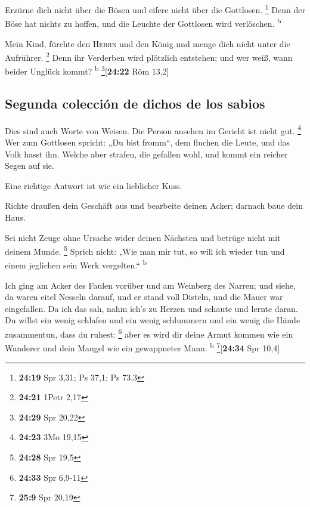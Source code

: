  Erzürne dich nicht über die Bösen und eifere nicht über
die Gottlosen. \footnote{\textbf{24:19} Spr 3,31; Ps 37,1; Ps 73,3}
 Denn der Böse hat nichts zu hoffen, und die Leuchte der
Gottlosen wird verlöschen. \textsuperscript{b}

 Mein Kind, fürchte den \textsc{Herrn} und den König und
menge dich nicht unter die Aufrührer. \footnote{\textbf{24:21} 1Petr
  2,17}  Denn ihr Verderben wird plötzlich entstehen; und
wer weiß, wann beider Unglück kommt? \textsuperscript{b}
\footnote{\textbf{24:29} Spr 20,22}{[}\textbf{24:22} Röm 13,2{]}

\hypertarget{segunda-colecciuxf3n-de-dichos-de-los-sabios}{%
\subsection{Segunda colección de dichos de los
sabios}\label{segunda-colecciuxf3n-de-dichos-de-los-sabios}}

 Dies sind auch Worte von Weisen. Die Person ansehen im
Gericht ist nicht gut. \footnote{\textbf{24:23} 3Mo 19,15}
 Wer zum Gottlosen spricht: „Du bist fromm``, dem fluchen
die Leute, und das Volk hasst ihn.  Welche aber strafen,
die gefallen wohl, und kommt ein reicher Segen auf sie.

 Eine richtige Antwort ist wie ein lieblicher Kuss.

 Richte draußen dein Geschäft aus und bearbeite deinen
Acker; darnach baue dein Haus.

 Sei nicht Zeuge ohne Ursache wider deinen Nächsten und
betrüge nicht mit deinem Munde. \footnote{\textbf{24:28} Spr 19,5}
 Sprich nicht: „Wie man mir tut, so will ich wieder tun
und einem jeglichen sein Werk vergelten.`` \textsuperscript{b}

 Ich ging am Acker des Faulen vorüber und am Weinberg des
Narren;  und siehe, da waren eitel Nesseln darauf, und er
stand voll Disteln, und die Mauer war eingefallen.  Da
ich das sah, nahm ich's zu Herzen und schaute und lernte daran.
 Du willst ein wenig schlafen und ein wenig schlummern
und ein wenig die Hände zusammentun, dass du ruhest: \footnote{\textbf{24:33}
  Spr 6,9-11}  aber es wird dir deine Armut kommen wie
ein Wanderer und dein Mangel wie ein gewappneter Mann.
\textsuperscript{b} \footnote{\textbf{25:9} Spr 20,19}{[}\textbf{24:34}
Spr 10,4{]}

